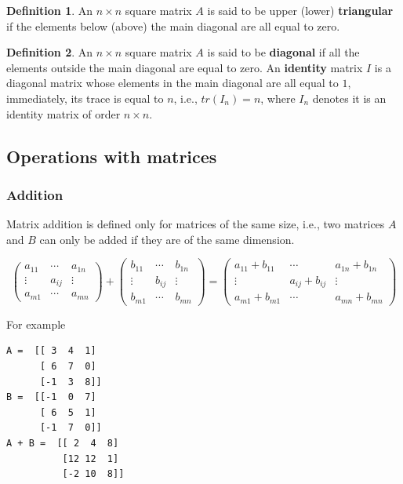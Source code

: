\documentclass[a4paper,11pt]{article}
\theoremstyle{definition}
\newtheorem{definition}{Definition}
\theoremstyle{plain}
\begin{document}
\begin{definition}
An \(n\times n\) square matrix \(A\) is said to be
upper (lower) \textbf{triangular} if the elements below (above) the main
diagonal are all equal to zero.
\end{definition}

\begin{definition}
An \(n\times n\) square matrix \(A\) is said to be
\textbf{diagonal} if all the elements outside the main diagonal are
equal to zero. An \textbf{identity} matrix \(I\) is a diagonal matrix
whose elements in the main diagonal are all equal to \(1\), immediately,
its trace is equal to \(n\), i.e., \(tr(I_n) = n\), where \(I_n\)
denotes it is an identity matrix of order \(n\times n\).
\end{definition}

\subsection{Operations with matrices}\label{operations-with-matrices}

\subsubsection{Addition}\label{addition}

Matrix addition is defined only for matrices of the same size, i.e., two
matrices \(A\) and \(B\) can only be added if they are of the same
dimension.

\[
\begin{pmatrix} a_{11} & \cdots & a_{1n} \\ \vdots & a_{ij} & \vdots \\ a_{m1} & \cdots & a_{mn} \end{pmatrix} + \begin{pmatrix} b_{11} & \cdots & b_{1n} \\ \vdots & b_{ij} & \vdots \\ b_{m1} & \cdots & b_{mn} \end{pmatrix} = \begin{pmatrix} a_{11} + b_{11} & \cdots & a_{1n} + b_{1n} \\ \vdots & a_{ij} + b_{ij} & \vdots \\ a_{m1} + b_{m1} & \cdots & a_{mn} + b_{mn} \end{pmatrix}
\]

For example

    \begin{Verbatim}[commandchars=\\\{\}]
A =  [[ 3  4  1]
      [ 6  7  0]
      [-1  3  8]]
B =  [[-1  0  7]
      [ 6  5  1]
      [-1  7  0]]
A + B =  [[ 2  4  8]
          [12 12  1]
          [-2 10  8]]

    \end{Verbatim}
\end{document}
